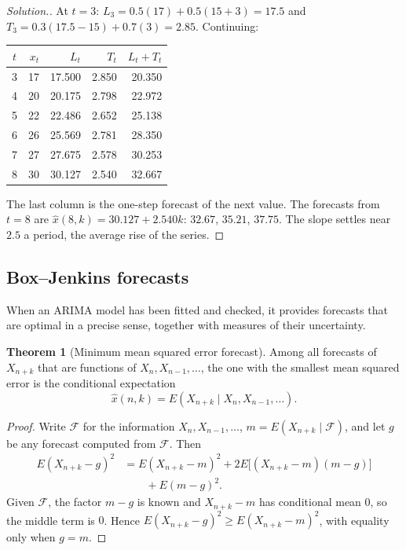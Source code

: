 \documentclass[11pt,a4paper]{article}
\theoremstyle{definition}
\newtheorem{thm}{Theorem}[subsection]
\newenvironment{solution}
  {\renewcommand{\qedsymbol}{}\begin{proof}[\textit{Solution}.]}
  {\end{proof}}
\begin{document}
\begin{solution}
At $t = 3$: $L_3 = 0.5(17) + 0.5(15 + 3) = 17.5$ and $T_3 = 0.3(17.5 - 15) + 0.7(3) = 2.85$. Continuing:
\begin{center}
\begin{tabular}{crrrr}
$t$ & $x_t$ & $L_t$ & $T_t$ & $L_t + T_t$ \\
\hline
3 & 17 & 17.500 & 2.850 & 20.350 \\
4 & 20 & 20.175 & 2.798 & 22.972 \\
5 & 22 & 22.486 & 2.652 & 25.138 \\
6 & 26 & 25.569 & 2.781 & 28.350 \\
7 & 27 & 27.675 & 2.578 & 30.253 \\
8 & 30 & 30.127 & 2.540 & 32.667 \\
\end{tabular}
\end{center}
The last column is the one-step forecast of the next value. The forecasts from $t = 8$ are $\hat x(8, k) = 30.127 + 2.540k$: $32.67$, $35.21$, $37.75$.
The slope settles near $2.5$ a period, the average rise of the series.
\end{solution}

\subsection{Box--Jenkins forecasts}
When an ARIMA model has been fitted and checked, it provides forecasts that are optimal in a precise sense,
together with measures of their uncertainty.

\begin{thm}[Minimum mean squared error forecast]\label{thm:mmse}
Among all forecasts of $X_{n+k}$ that are functions of $X_n, X_{n-1}, \dots$, the one with the smallest mean squared error
is the conditional expectation
\[
\hat x(n, k) = E(X_{n+k} \mid X_n, X_{n-1}, \dots) .
\]
\end{thm}

\begin{proof}
Write $\mathcal{F}$ for the information $X_n, X_{n-1}, \dots$, $m = E(X_{n+k} \mid \mathcal{F})$, and let $g$ be any forecast computed from $\mathcal{F}$. Then
\begin{align*}
E(X_{n+k} - g)^2 &= E(X_{n+k} - m)^2 + 2E\bigl[(X_{n+k} - m)(m - g)\bigr] \\
&\qquad + E(m - g)^2 .
\end{align*}
Given $\mathcal{F}$, the factor $m - g$ is known and $X_{n+k} - m$ has conditional mean $0$, so the middle term is $0$. Hence $E(X_{n+k} - g)^2 \ge E(X_{n+k} - m)^2$,
with equality only when $g = m$.
\end{proof}
\end{document}
